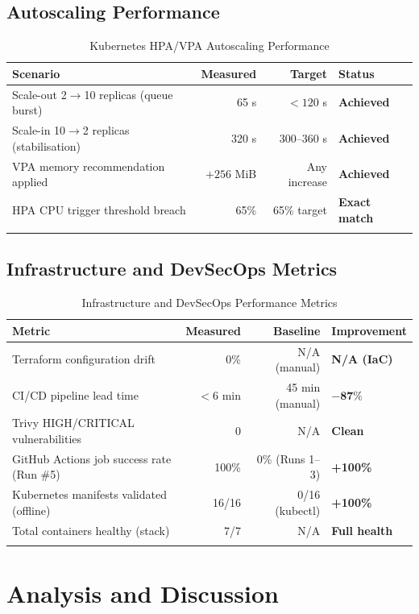 \documentclass[12pt,a4paper]{report}
\begin{document}
\subsection{Autoscaling Performance}

\begin{longtable}{@{}p{5cm}rrl@{}}
  \toprule
  \textbf{Scenario} & \textbf{Measured} & \textbf{Target} & \textbf{Status} \\
  \midrule
  Scale-out 2$\to$10 replicas (queue burst) & 65 s & $<120$ s &
    \textbf{Achieved} \\[0.2cm]
  Scale-in 10$\to$2 replicas (stabilisation) & 320 s & 300--360 s &
    \textbf{Achieved} \\[0.2cm]
  VPA memory recommendation applied & $+256$ MiB & Any increase &
    \textbf{Achieved} \\[0.2cm]
  HPA CPU trigger threshold breach & 65\% & 65\% target &
    \textbf{Exact match} \\
  \bottomrule
  \caption{Kubernetes HPA/VPA Autoscaling Performance}
  \label{tab:hpa}
\end{longtable}

\subsection{Infrastructure and DevSecOps Metrics}

\begin{longtable}{@{}p{5.5cm}rrl@{}}
  \toprule
  \textbf{Metric} & \textbf{Measured} & \textbf{Baseline} & \textbf{Improvement} \\
  \midrule
  Terraform configuration drift & 0\% & N/A (manual) & \textbf{N/A (IaC)} \\[0.2cm]
  CI/CD pipeline lead time & $<6$ min & 45 min (manual) & $\mathbf{-87\%}$ \\[0.2cm]
  Trivy HIGH/CRITICAL vulnerabilities & 0 & N/A & \textbf{Clean} \\[0.2cm]
  GitHub Actions job success rate (Run \#5) & 100\% & 0\% (Runs 1--3) & \textbf{+100\%} \\[0.2cm]
  Kubernetes manifests validated (offline) & 16/16 & 0/16 (kubectl) & \textbf{+100\%} \\[0.2cm]
  Total containers healthy (stack) & 7/7 & N/A & \textbf{Full health} \\
  \bottomrule
  \caption{Infrastructure and DevSecOps Performance Metrics}
  \label{tab:devops}
\end{longtable}

\section{Analysis and Discussion}
\end{document}
